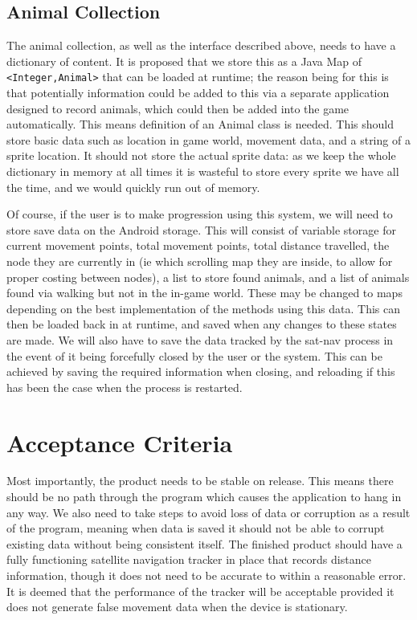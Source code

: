 \documentclass[12pt,a4paper,twoside]{article}
\begin{document}
\subsection{Animal Collection}
The animal collection, as well as the interface described above, needs to have a dictionary of content.
It is proposed that we store this as a Java Map of \verb|<Integer,Animal>| that can be loaded at runtime; the reason being for this is that potentially information could be added to this via a separate application designed to record animals, which could then be added into the game automatically.
This means definition of an Animal class is needed.
This should store basic data such as location in game world, movement data, and a string of a sprite location. It should not store the actual sprite data: as we keep the whole dictionary in memory at all times it is wasteful to store every sprite we have all the time, and we would quickly run out of memory.


Of course, if the user is to make progression using this system, we will need to store save data on the Android storage.
This will consist of variable storage for current movement points, total movement points, total distance travelled, the node they are currently in (ie which scrolling map they are inside, to allow for proper costing between nodes), a list to store found animals, and a list of animals found via walking but not in the in-game world.
These may be changed to maps depending on the best implementation of the methods using this data.
This can then be loaded back in at runtime, and saved when any changes to these states are made.
We will also have to save the data tracked by the sat-nav process in the event of it being forcefully closed by the user or the system.
This can be achieved by saving the required information when closing, and reloading if this has been the case when the process is restarted.

\section{Acceptance Criteria}
Most importantly, the product needs to be stable on release.
This means there should be no path through the program which causes the application to hang in any way.
We also need to take steps to avoid loss of data or corruption as a result of the program, meaning when data is saved it should not be able to corrupt existing data without being consistent itself.
The finished product should have a fully functioning satellite navigation tracker in place that records distance information, though it does not need to be accurate to within a reasonable error.
It is deemed that the performance of the tracker will be acceptable provided it does not generate false movement data when the device is stationary.
\end{document}
